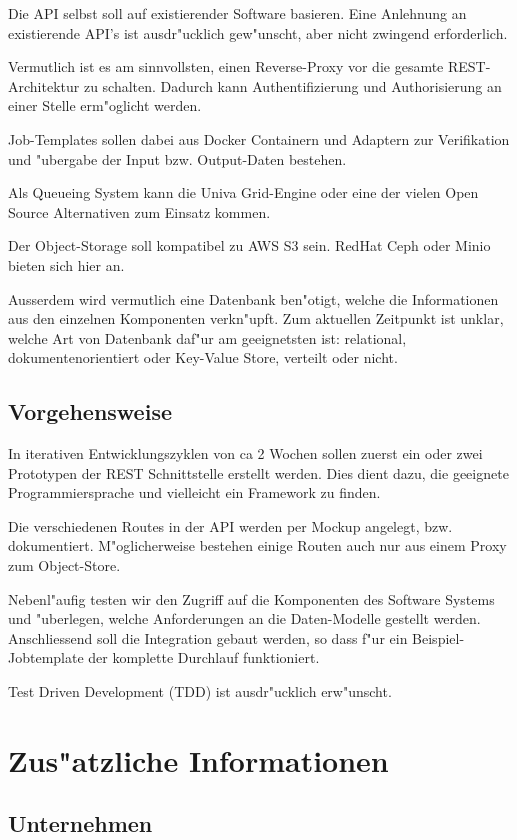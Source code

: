 \documentclass[12pt]{article}
\begin{document}
Die API selbst soll auf existierender Software basieren. Eine Anlehnung an existierende API's ist ausdr"ucklich gew"unscht, aber nicht zwingend erforderlich.

Vermutlich ist es am sinnvollsten, einen Reverse-Proxy vor die gesamte REST-Architektur zu schalten. Dadurch kann Authentifizierung und Authorisierung an einer Stelle erm"oglicht werden.

Job-Templates sollen dabei aus Docker Containern und Adaptern zur Verifikation und "ubergabe der Input bzw. Output-Daten bestehen.

Als Queueing System kann die Univa Grid-Engine oder eine der vielen Open Source Alternativen zum Einsatz kommen.

Der Object-Storage soll kompatibel zu AWS S3 sein. RedHat Ceph oder Minio bieten sich hier an.

Ausserdem wird vermutlich eine Datenbank ben"otigt, welche die Informationen aus den einzelnen Komponenten verkn"upft. Zum aktuellen Zeitpunkt ist unklar, welche Art von Datenbank daf"ur am geeignetsten ist: relational, dokumentenorientiert oder Key-Value Store, verteilt oder nicht.

\subsection{Vorgehensweise}

In iterativen Entwicklungszyklen von ca 2 Wochen sollen zuerst ein oder zwei Prototypen der REST Schnittstelle erstellt werden. Dies dient dazu, die geeignete Programmiersprache und vielleicht ein Framework zu finden.

Die verschiedenen Routes in der API werden per Mockup angelegt, bzw. dokumentiert. M"oglicherweise bestehen einige Routen auch nur aus einem Proxy zum Object-Store.

Nebenl"aufig testen wir den Zugriff auf die Komponenten des Software Systems und "uberlegen, welche Anforderungen an die Daten-Modelle gestellt werden. Anschliessend soll die Integration gebaut werden, so dass f"ur ein Beispiel-Jobtemplate der komplette Durchlauf funktioniert.

Test Driven Development (TDD) ist ausdr"ucklich erw"unscht.
\newpage

\section{Zus"atzliche Informationen}
\subsection{Unternehmen}
\end{document}
